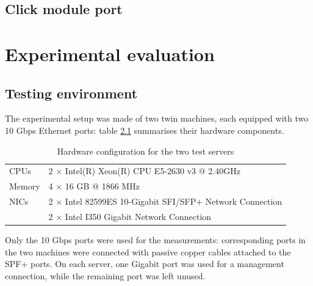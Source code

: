 \documentclass[12pt,a4paper,twoside]{book}
\begin{document}
\section{Click module port}\label{sec:augustus.click}



\chapter{Experimental evaluation}
\label{chap:test}

\section{Testing environment}\label{sec:test.env}
The experimental setup was made of two twin machines, each equipped with two 10 Gbps Ethernet ports:
table \ref{tab:test.hw} summarises their hardware components.

\begin{table}[tb]
  \begin{center}
    \begin{tabular}{ll}
      \toprule
      CPUs   & 2 $\times$ Intel(R) Xeon(R) CPU E5-2630 v3 @ 2.40GHz \\
      Memory & 4 $\times$ 16 GB @ 1866 MHz\\
      NICs   & 2 $\times$ Intel 82599ES 10-Gigabit SFI/SFP+ Network Connection \\
             & 2 $\times$ Intel I350 Gigabit Network Connection \\
      \bottomrule
    \end{tabular}
  \end{center}
  \caption{Hardware configuration for the two test servers}
  \label{tab:test.hw}
\end{table}

Only the 10 Gbps ports were used for the measurements: corresponding ports in the two machines were connected with passive copper cables attached to the SPF+ ports. On each server, one Gigabit port was used for a management connection, while the remaining port was left unused.
\end{document}
